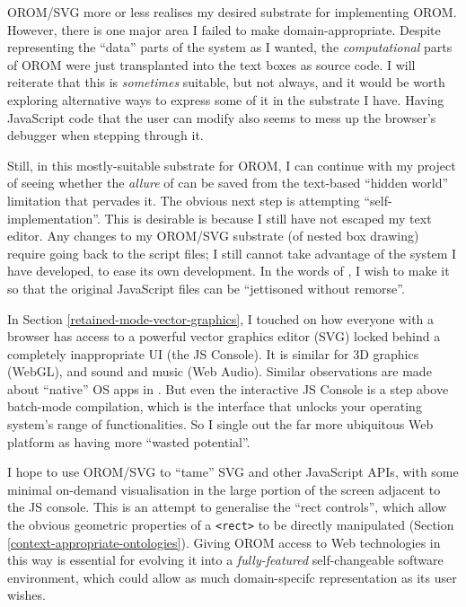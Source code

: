 OROM/SVG more or less realises my desired substrate for implementing
OROM. However, there is one major area I failed to make
domain-appropriate. Despite representing the ``data'' parts of the
system as I wanted, the \emph{computational} parts of OROM were just
transplanted into the text boxes as source code. I will reiterate that
this is \emph{sometimes} suitable, but not always, and it would be worth
exploring alternative ways to express some of it in the substrate I
have. Having JavaScript code that the user can modify also seems to mess
up the browser's debugger when stepping through it.

Still, in this mostly-suitable substrate for OROM, I can continue with
my project of seeing whether the \emph{allure} of \cite{COLAs} can be
saved from the text-based ``hidden world'' limitation that pervades it.
The obvious next step is attempting ``self-implementation''. This is
desirable is because I still have not escaped my text editor. Any
changes to my OROM/SVG substrate (of nested box drawing) require going
back to the script files; I still cannot take advantage of the system I
have developed, to ease its own development. In the words of
\cite{COLAs}, I wish to make it so that the original JavaScript files
can be ``jettisoned without remorse''.

In Section \ref{retained-mode-vector-graphics}, I touched on how
everyone with a browser has access to a powerful vector graphics editor
(SVG) locked behind a completely inappropriate UI (the JS Console). It
is similar for 3D graphics (WebGL), and sound and music (Web Audio).
Similar observations are made about ``native'' OS apps in
\cite{prog21-dyn}. But even the interactive JS Console is a step above
batch-mode compilation, which is the interface that unlocks your
operating system's range of functionalities. So I single out the far
more ubiquitous Web platform as having more ``wasted potential''.

I hope to use OROM/SVG to ``tame'' SVG and other JavaScript APIs, with
some minimal on-demand visualisation in the large portion of the screen
adjacent to the JS console. This is an attempt to generalise the ``rect
controls'', which allow the obvious geometric properties of a
\texttt{\textless{}rect\textgreater{}} to be directly manipulated
(Section \ref{context-appropriate-ontologies}). Giving OROM access to
Web technologies in this way is essential for evolving it into a
\emph{fully-featured} self-changeable software environment, which could
allow as much domain-specifc representation as its user wishes.
